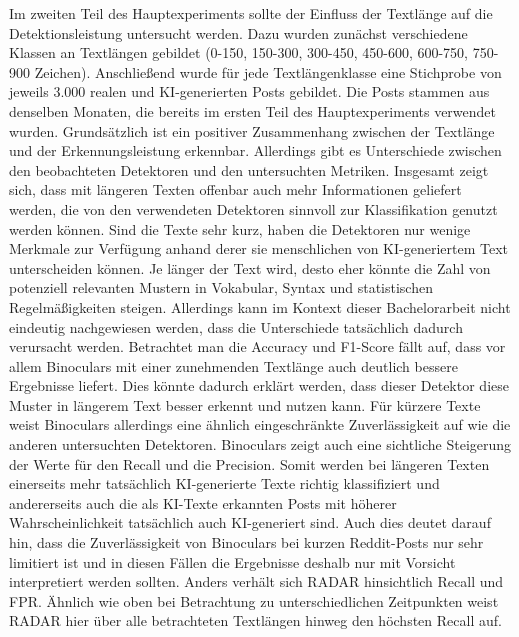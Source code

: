 Im zweiten Teil des Hauptexperiments sollte der Einfluss der Textlänge auf die Detektionsleistung untersucht werden. Dazu wurden zunächst verschiedene Klassen an Textlängen gebildet (0-150, 150-300, 300-450, 450-600, 600-750, 750-900 Zeichen). Anschließend wurde für jede Textlängenklasse eine Stichprobe von jeweils 3.000 realen und KI-generierten Posts gebildet. Die Posts stammen aus denselben Monaten, die bereits im ersten Teil des Hauptexperiments verwendet wurden. Grundsätzlich ist ein positiver Zusammenhang zwischen der Textlänge und der Erkennungsleistung erkennbar. Allerdings gibt es Unterschiede zwischen den beobachteten Detektoren und den untersuchten Metriken. Insgesamt zeigt sich, dass mit längeren Texten offenbar auch mehr Informationen geliefert werden, die von den verwendeten Detektoren sinnvoll zur Klassifikation genutzt werden können. Sind die Texte sehr kurz, haben die Detektoren nur wenige Merkmale zur Verfügung anhand derer sie menschlichen von KI-generiertem Text unterscheiden können. Je länger der Text wird, desto eher könnte die Zahl von potenziell relevanten Mustern in Vokabular, Syntax und statistischen Regelmäßigkeiten steigen. Allerdings kann im Kontext dieser Bachelorarbeit nicht eindeutig nachgewiesen werden, dass die Unterschiede tatsächlich dadurch verursacht werden. Betrachtet man die Accuracy und F1-Score fällt auf, dass vor allem Binoculars mit einer zunehmenden Textlänge auch deutlich bessere Ergebnisse liefert. Dies könnte dadurch erklärt werden, dass dieser Detektor diese Muster in längerem Text besser erkennt und nutzen kann. Für kürzere Texte weist Binoculars allerdings eine ähnlich eingeschränkte Zuverlässigkeit auf wie die anderen untersuchten Detektoren. Binoculars zeigt auch eine sichtliche Steigerung der Werte für den Recall und die Precision. Somit werden bei längeren Texten einerseits mehr tatsächlich KI-generierte Texte richtig klassifiziert und andererseits auch die als KI-Texte erkannten Posts mit höherer Wahrscheinlichkeit tatsächlich auch KI-generiert sind. Auch dies deutet darauf hin, dass die Zuverlässigkeit von Binoculars bei kurzen Reddit-Posts nur sehr limitiert ist und in diesen Fällen die Ergebnisse deshalb nur mit Vorsicht interpretiert werden sollten. Anders verhält sich RADAR hinsichtlich Recall und FPR. Ähnlich wie oben bei Betrachtung zu unterschiedlichen Zeitpunkten weist RADAR hier über alle betrachteten Textlängen hinweg den höchsten Recall auf.
